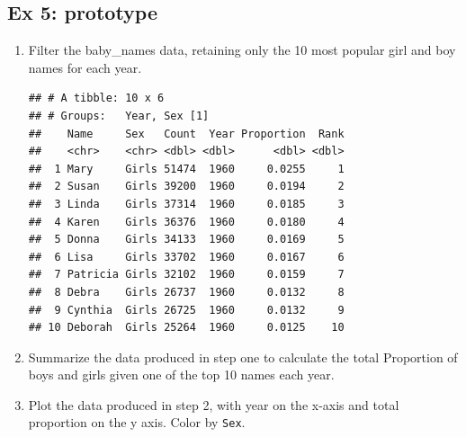 \documentclass[
]{book}
\newenvironment{Shaded}{\begin{snugshade}}{\end{snugshade}}
\newcommand{\CommentTok}[1]{\textcolor[rgb]{0.56,0.35,0.01}{\textit{#1}}}
\newcommand{\DataTypeTok}[1]{\textcolor[rgb]{0.13,0.29,0.53}{#1}}
\newcommand{\DecValTok}[1]{\textcolor[rgb]{0.00,0.00,0.81}{#1}}
\newcommand{\KeywordTok}[1]{\textcolor[rgb]{0.13,0.29,0.53}{\textbf{#1}}}
\newcommand{\NormalTok}[1]{#1}
\newcommand{\OperatorTok}[1]{\textcolor[rgb]{0.81,0.36,0.00}{\textbf{#1}}}
\newcommand{\StringTok}[1]{\textcolor[rgb]{0.31,0.60,0.02}{#1}}
\begin{document}
\hypertarget{ex-5-prototype}{%
\subsection{Ex 5: prototype}\label{ex-5-prototype}}

\begin{enumerate}
\def\labelenumi{\arabic{enumi}.}
\item
  Filter the baby\_names data, retaining only the 10 most popular girl and boy names for each year.

\begin{Shaded}
\end{Shaded}

\begin{verbatim}
## # A tibble: 10 x 6
## # Groups:   Year, Sex [1]
##    Name     Sex   Count  Year Proportion  Rank
##    <chr>    <chr> <dbl> <dbl>      <dbl> <dbl>
##  1 Mary     Girls 51474  1960     0.0255     1
##  2 Susan    Girls 39200  1960     0.0194     2
##  3 Linda    Girls 37314  1960     0.0185     3
##  4 Karen    Girls 36376  1960     0.0180     4
##  5 Donna    Girls 34133  1960     0.0169     5
##  6 Lisa     Girls 33702  1960     0.0167     6
##  7 Patricia Girls 32102  1960     0.0159     7
##  8 Debra    Girls 26737  1960     0.0132     8
##  9 Cynthia  Girls 26725  1960     0.0132     9
## 10 Deborah  Girls 25264  1960     0.0125    10
\end{verbatim}
\item
  Summarize the data produced in step one to calculate the total Proportion of boys and girls given one of the top 10 names each year.

\begin{Shaded}
\end{Shaded}
\item
  Plot the data produced in step 2, with year on the x-axis and total proportion on the y axis. Color by \texttt{Sex}.


\end{enumerate}
\end{document}
